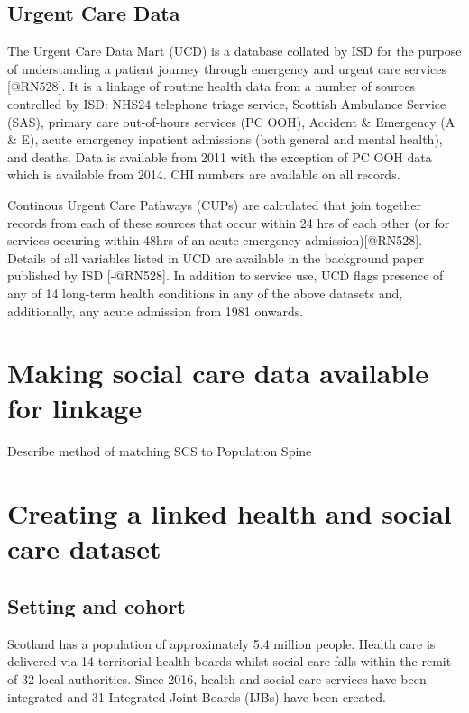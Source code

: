\documentclass[]{article}
\begin{document}
\subsection{Urgent Care Data}\label{subsec:source-ucd}

The Urgent Care Data Mart (UCD) is a database collated by ISD for the
purpose of understanding a patient journey through emergency and urgent
care services {[}@RN528{]}. It is a linkage of routine health data from
a number of sources controlled by ISD: NHS24 telephone triage service,
Scottish Ambulance Service (SAS), primary care out-of-hours services (PC
OOH), Accident \& Emergency (A \& E), acute emergency inpatient
admissions (both general and mental health), and deaths. Data is
available from 2011 with the exception of PC OOH data which is available
from 2014. CHI numbers are available on all records.

Continous Urgent Care Pathways (CUPs) are calculated that join together
records from each of these sources that occur within 24 hrs of each
other (or for services occuring within 48hrs of an acute emergency
admission){[}@RN528{]}. Details of all variables listed in UCD are
available in the background paper published by ISD {[}-@RN528{]}. In
addition to service use, UCD flags presence of any of 14 long-term
health conditions in any of the above datasets and, additionally, any
acute admission from 1981 onwards.

\section{Making social care data available for linkage}\label{sec:linkage}

Describe method of matching SCS to Population Spine

\section{Creating a linked health and social care dataset}\label{sec:make-dataset}

\FloatBarrier

\subsection{Setting and cohort}\label{subsec:setting-cohort}

Scotland has a population of approximately 5.4 million people. Health
care is delivered via 14 territorial health boards whilst social care
falls within the remit of 32 local authorities. Since 2016, health and
social care services have been integrated and 31 Integrated Joint Boards
(IJBs) have been created.
\end{document}
